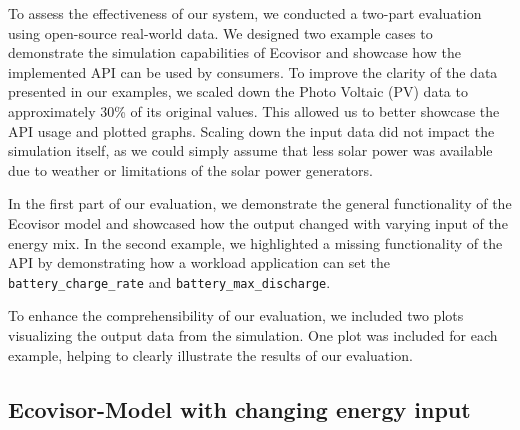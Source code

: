 To assess the effectiveness of our system, we conducted a two-part evaluation
using open-source real-world data. We designed two example cases to demonstrate
the simulation capabilities of Ecovisor and showcase how the implemented API can
be used by consumers. To improve the clarity of the data presented in our
examples, we scaled down the Photo Voltaic (PV) data to approximately 30\% of
its original values. This allowed us to better showcase the API usage and
plotted graphs. Scaling down the input data did not impact the simulation
itself, as we could simply assume that less solar power was available due to
weather or limitations of the solar power generators.

In the first part of our evaluation, we demonstrate the general functionality of
the Ecovisor model and showcased how the output changed with varying input of
the energy mix. In the second example, we highlighted a missing functionality
of the API by demonstrating how a workload application can set the
\texttt{battery\_charge\_rate} and \texttt{battery\_max\_discharge}.

To enhance the comprehensibility of our evaluation, we included two plots
visualizing the output data from the simulation. One plot was included for each
example, helping to clearly illustrate the results of our evaluation.


\subsection{Ecovisor-Model with changing energy input}

